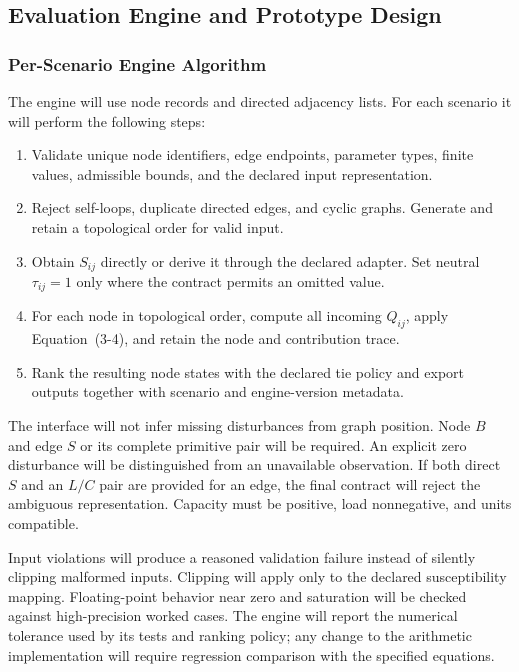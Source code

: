 \subsection{Evaluation Engine and Prototype Design}\label{engine-design}

\subsubsection{Per-Scenario Engine Algorithm}

The engine will use node records and directed adjacency lists. For each
scenario it will perform the following steps:
\begin{enumerate}[label=\arabic*.,leftmargin=*]
\item Validate unique node identifiers, edge endpoints, parameter types,
finite values, admissible bounds, and the declared input representation.
\item Reject self-loops, duplicate directed edges, and cyclic graphs.
Generate and retain a topological order for valid input.
\item Obtain $S_{ij}$ directly or derive it through the declared adapter.
Set neutral $\tau_{ij}=1$ only where the contract permits an omitted value.
\item For each node in topological order, compute all incoming $Q_{ij}$,
apply Equation~(3-4), and retain the node and contribution trace.
\item Rank the resulting node states with the declared tie policy and
export outputs together with scenario and engine-version metadata.
\end{enumerate}

The interface will not infer missing disturbances from graph position.
Node $B$ and edge $S$ or its complete primitive pair will be required.
An explicit zero disturbance will be distinguished from an unavailable
observation. If both direct $S$ and an $L/C$ pair are provided for an edge,
the final contract will reject the ambiguous representation. Capacity
must be positive, load nonnegative, and units compatible.

Input violations will produce a reasoned validation failure instead of
silently clipping malformed inputs. Clipping will apply only to the
declared susceptibility mapping. Floating-point behavior near zero and
saturation will be checked against high-precision worked cases. The
engine will report the numerical tolerance used by its tests and ranking
policy; any change to the arithmetic implementation will require
regression comparison with the specified equations.

